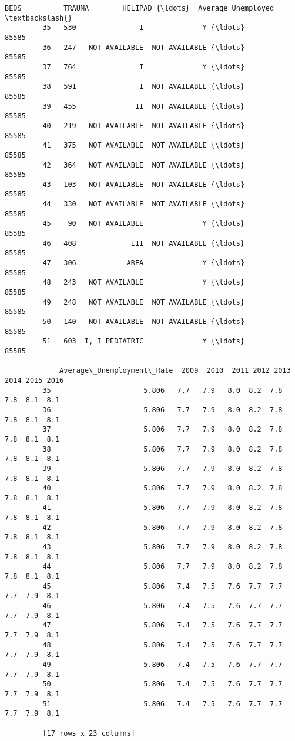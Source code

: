 \documentclass[11pt]{article}
\begin{document}
\begin{Verbatim}[commandchars=\\\{\}]
             BEDS          TRAUMA        HELIPAD {\ldots}  Average Unemployed   \textbackslash{}
         35   530               I              Y {\ldots}                85585   
         36   247   NOT AVAILABLE  NOT AVAILABLE {\ldots}                85585   
         37   764               I              Y {\ldots}                85585   
         38   591               I  NOT AVAILABLE {\ldots}                85585   
         39   455              II  NOT AVAILABLE {\ldots}                85585   
         40   219   NOT AVAILABLE  NOT AVAILABLE {\ldots}                85585   
         41   375   NOT AVAILABLE  NOT AVAILABLE {\ldots}                85585   
         42   364   NOT AVAILABLE  NOT AVAILABLE {\ldots}                85585   
         43   103   NOT AVAILABLE  NOT AVAILABLE {\ldots}                85585   
         44   330   NOT AVAILABLE  NOT AVAILABLE {\ldots}                85585   
         45    90   NOT AVAILABLE              Y {\ldots}                85585   
         46   408             III  NOT AVAILABLE {\ldots}                85585   
         47   306            AREA              Y {\ldots}                85585   
         48   243   NOT AVAILABLE              Y {\ldots}                85585   
         49   248   NOT AVAILABLE  NOT AVAILABLE {\ldots}                85585   
         50   140   NOT AVAILABLE  NOT AVAILABLE {\ldots}                85585   
         51   603  I, I PEDIATRIC              Y {\ldots}                85585   
         
             Average\_Unemployment\_Rate  2009  2010  2011 2012 2013 2014 2015 2016  
         35                      5.806   7.7   7.9   8.0  8.2  7.8  7.8  8.1  8.1  
         36                      5.806   7.7   7.9   8.0  8.2  7.8  7.8  8.1  8.1  
         37                      5.806   7.7   7.9   8.0  8.2  7.8  7.8  8.1  8.1  
         38                      5.806   7.7   7.9   8.0  8.2  7.8  7.8  8.1  8.1  
         39                      5.806   7.7   7.9   8.0  8.2  7.8  7.8  8.1  8.1  
         40                      5.806   7.7   7.9   8.0  8.2  7.8  7.8  8.1  8.1  
         41                      5.806   7.7   7.9   8.0  8.2  7.8  7.8  8.1  8.1  
         42                      5.806   7.7   7.9   8.0  8.2  7.8  7.8  8.1  8.1  
         43                      5.806   7.7   7.9   8.0  8.2  7.8  7.8  8.1  8.1  
         44                      5.806   7.7   7.9   8.0  8.2  7.8  7.8  8.1  8.1  
         45                      5.806   7.4   7.5   7.6  7.7  7.7  7.7  7.9  8.1  
         46                      5.806   7.4   7.5   7.6  7.7  7.7  7.7  7.9  8.1  
         47                      5.806   7.4   7.5   7.6  7.7  7.7  7.7  7.9  8.1  
         48                      5.806   7.4   7.5   7.6  7.7  7.7  7.7  7.9  8.1  
         49                      5.806   7.4   7.5   7.6  7.7  7.7  7.7  7.9  8.1  
         50                      5.806   7.4   7.5   7.6  7.7  7.7  7.7  7.9  8.1  
         51                      5.806   7.4   7.5   7.6  7.7  7.7  7.7  7.9  8.1  
         
         [17 rows x 23 columns]
\end{Verbatim}
            
\end{document}
